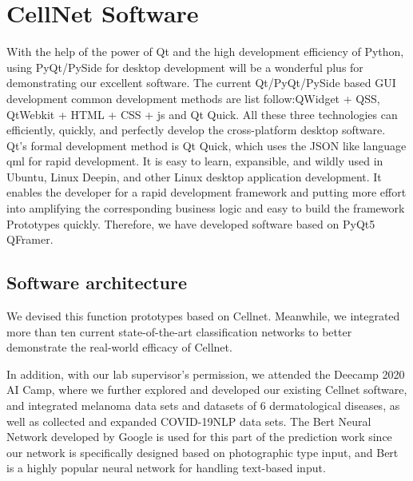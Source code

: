 \section{CellNet Software}
\label{sec:ipsum}
With the help of the power of Qt and the high development efficiency of Python, using PyQt/PySide for desktop development will be a wonderful plus for demonstrating our excellent software.
The current Qt/PyQt/PySide based GUI development common development methods are list follow:QWidget + QSS, QtWebkit + HTML + CSS + js and Qt Quick. All these three technologies can efficiently, quickly, and perfectly develop the cross-platform desktop software. Qt's formal development method is Qt Quick, which uses the JSON like language qml for rapid development. It is easy to learn, expansible, and wildly used in  Ubuntu, Linux Deepin, and other Linux desktop application development. It enables the developer for a rapid development framework and putting more effort into amplifying the corresponding business logic and easy to build the framework Prototypes quickly. Therefore, we have developed software based on PyQt5 QFramer.

\subsection{Software architecture} %
\label{sub:dolor_sit}
We devised this function prototypes based on Cellnet. Meanwhile, we integrated more than ten current state-of-the-art classification networks to better demonstrate the real-world efficacy of Cellnet.

In addition, with our lab supervisor's permission, we attended the Deecamp 2020 AI Camp, where we further explored and developed our existing Cellnet software, and integrated melanoma data sets and datasets of 6 dermatological diseases, as well as collected and expanded COVID-19NLP data sets. The Bert Neural Network developed by Google is used for this part of the prediction work since our network is specifically designed based on photographic type input, and Bert is a highly popular neural network for handling text-based input.

